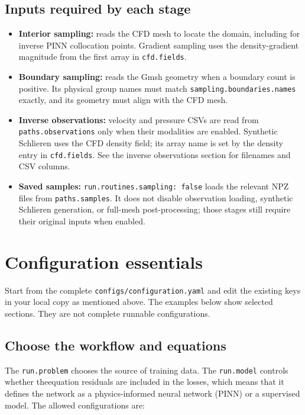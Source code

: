 \documentclass[11pt,a4paper]{article}
\newcommand{\code}[1]{\nolinkurl{#1}}
\begin{document}
\subsection{Inputs required by each stage}

\begin{itemize}
  \item \textbf{Interior sampling:} reads the CFD mesh to locate the domain, including for
  inverse PINN collocation points. Gradient sampling uses the density-gradient
  magnitude from the first array in \code{cfd.fields}.
  \item \textbf{Boundary sampling:} reads the Gmsh geometry when a boundary count is
  positive. Its physical group names must match \code{sampling.boundaries.names}
  exactly, and its geometry must align with the CFD mesh.
  \item \textbf{Inverse observations:} velocity and pressure CSVs are read from
  \code{paths.observations} only when their modalities are enabled. Synthetic
  Schlieren uses the CFD density field; its array name is set by
  the density entry in \code{cfd.fields}. See the inverse
  observations section for filenames and CSV columns.
  \item \textbf{Saved samples:} \code{run.routines.sampling: false} loads the 
  relevant NPZ files from \code{paths.samples}. It does not disable observation 
  loading, synthetic Schlieren generation, or full-mesh post-processing; those stages
  still require their original inputs when enabled.

\end{itemize}
\section{Configuration essentials}
\label{sec:configuration}

Start from the complete \code{configs/configuration.yaml} and edit the existing
keys in your local copy as mentioned above. The examples below show selected 
sections. They are not complete runnable configurations. 

\subsection{Choose the workflow and equations}

The \code{run.problem} chooses the source of training data. The \code{run.model} 
controls whether theequation residuals are included in the losses, which means that 
it defines the network as a physics-informed neural network (PINN) or a supervised 
model. The allowed configurations are:
\end{document}
